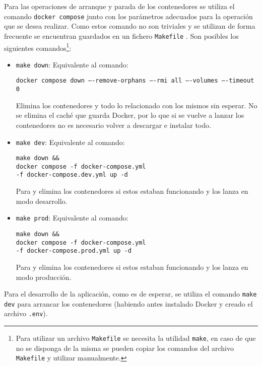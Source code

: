 Para las operaciones de arranque y parada de los contenedores se utiliza el
comando \texttt{docker compose} junto con los parámetros adecuados para la
operación que se desea realizar. Como estos comando no son triviales y se
utilizan de forma frecuente se encuentran guardados en un fichero
\texttt{Makefile}
. Son posibles los siguientes comandos\footnote{Para utilizar un archivo
    \texttt{Makefile} se necesita la utilidad \texttt{make}, en caso de que no
    se disponga de la misma se pueden copiar los comandos del archivo
    \texttt{Makefile} y utilizar manualmente.}:

\begin{itemize}
    \item \texttt{make down}: Equivalente al comando:
          \begin{flushleft}
              \texttt{docker compose down ----remove-orphans ----rmi all ----volumes ----timeout 0}
          \end{flushleft}
          Elimina los contenedores y todo lo relacionado con los mismos sin
          esperar. No se elimina el caché que guarda Docker, por lo que si se
          vuelve a lanzar los contenedores no es necesario volver a descargar e
          instalar todo.

    \item \texttt{make dev}: Equivalente al comando:
          \begin{flushleft}
              \texttt{make down \&\& \\
                  docker compose -f docker-compose.yml \\
                  -f docker-compose.dev.yml up -d}
          \end{flushleft}
          Para y elimina los contenedores si estos estaban funcionando y los
          lanza en modo desarrollo.

    \item \texttt{make prod}: Equivalente al comando:
          \begin{flushleft}
              \texttt{make down \&\& \\
                  docker compose -f docker-compose.yml \\
                  -f docker-compose.prod.yml up -d}
          \end{flushleft}
          Para y elimina los contenedores si estos estaban funcionando y los
          lanza en modo producción.
\end{itemize}

Para el desarrollo de la aplicación, como es de esperar, se utiliza el comando
\texttt{make dev} para arrancar los contenedores (habiendo antes instalado
Docker y creado el archivo \texttt{.env}).

